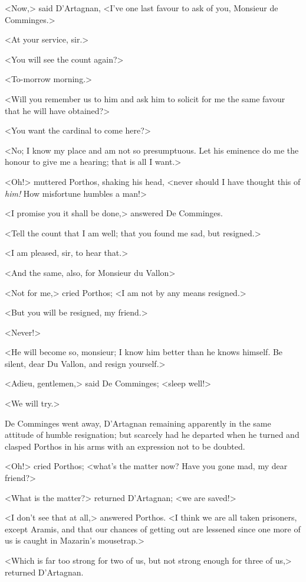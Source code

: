 <Now,> said D'Artagnan, <I've one last favour to ask of you, Monsieur de Comminges.>

<At your service, sir.>

<You will see the count again?>

<To-morrow morning.>

<Will you remember us to him and ask him to solicit for me the same favour that he will have obtained?>

<You want the cardinal to come here?>

<No; I know my place and am not so presumptuous. Let his eminence do me the honour to give me a hearing; that is all I want.>

<Oh!> muttered Porthos, shaking his head, <never should I have thought this of \emph{him!} How misfortune humbles a man!>

<I promise you it shall be done,> answered De Comminges.

<Tell the count that I am well; that you found me sad, but resigned.>

<I am pleased, sir, to hear that.>

<And the same, also, for Monsieur du Vallon\longdash>

<Not for me,> cried Porthos; <I am not by any means resigned.>

<But you will be resigned, my friend.>

<Never!>

<He will become so, monsieur; I know him better than he knows himself. Be silent, dear Du Vallon, and resign yourself.>

<Adieu, gentlemen,> said De Comminges; <sleep well!>

<We will try.>

De Comminges went away, D'Artagnan remaining apparently in the same attitude of humble resignation; but scarcely had he departed when he turned and clasped Porthos in his arms with an expression not to be doubted.

<Oh!> cried Porthos; <what's the matter now? Have you gone mad, my dear friend?>

<What is the matter?> returned D'Artagnan; <we are saved!>

<I don't see that at all,> answered Porthos. <I think we are all taken prisoners, except Aramis, and that our chances of getting out are lessened since one more of us is caught in Mazarin's mousetrap.>

<Which is far too strong for two of us, but not strong enough for three of us,> returned D'Artagnan.

